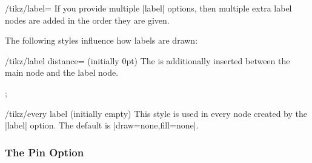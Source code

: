 \begin{key}{/tikz/label=}
  If you provide multiple |label| options, then multiple extra label
  nodes are added in the order they are given.

  The following styles influence how labels are drawn:
  \begin{key}{/tikz/label distance= (initially 0pt)}
    The  is additionally inserted between the main node
    and the label node.
\begin{codeexample}[]
\tikz[label distance=5mm]
  ;
\end{codeexample}
  \end{key}
  \begin{stylekey}{/tikz/every label (initially \normalfont empty)}
    This style is used in every node created by the |label|
    option. The default is |draw=none,fill=none|.
  \end{stylekey}
\end{key}


\subsubsection{The Pin Option}

